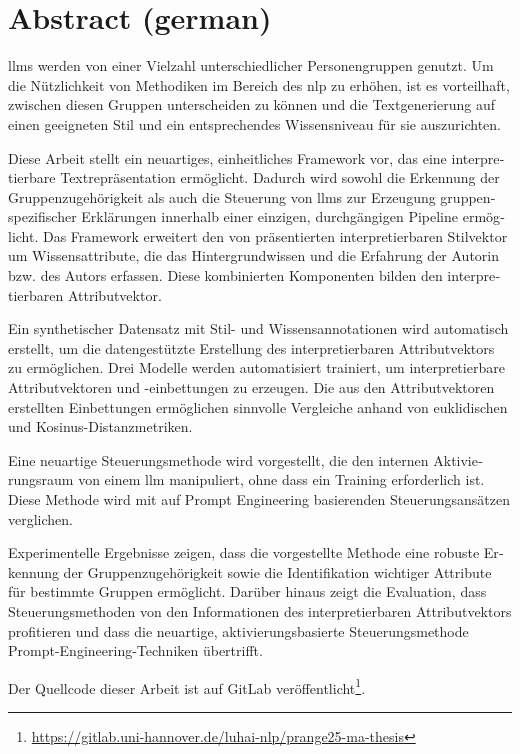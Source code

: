 \vspace*{20mm}

\chapter*{Abstract (german)}%
\label{sec:abstract-german}
\vspace*{-10mm}

\begin{otherlanguage}{ngerman}
  \Acfp{llm} werden von einer Vielzahl unterschiedlicher Personengruppen genutzt. Um die Nützlichkeit von Methodiken im Bereich des \acf{nlp} zu erhöhen, ist es vorteilhaft, zwischen diesen Gruppen unterscheiden zu können und die Textgenerierung auf einen geeigneten Stil und ein entsprechendes Wissensniveau für sie auszurichten.

  Diese Arbeit stellt ein neuartiges, einheitliches Framework vor, das eine interpretierbare Textrepräsentation ermöglicht. Dadurch wird sowohl die Erkennung der Gruppenzugehörigkeit als auch die Steuerung von \acp{llm} zur Erzeugung gruppenspezifischer Erklärungen innerhalb einer einzigen, durchgängigen Pipeline ermöglicht. Das Framework erweitert den von \citet{patelLearningInterpretableStyle2023} präsentierten interpretierbaren Stilvektor um Wissensattribute, die das Hintergrundwissen und die Erfahrung der Autorin bzw. des Autors erfassen. Diese kombinierten Komponenten bilden den interpretierbaren Attributvektor.

  Ein synthetischer Datensatz mit Stil- und Wissensannotationen wird automatisch erstellt, um die datengestützte Erstellung des interpretierbaren Attributvektors zu ermöglichen. Drei Modelle werden automatisiert trainiert, um interpretierbare Attributvektoren und -einbettungen zu erzeugen. Die aus den Attributvektoren erstellten Einbettungen ermöglichen sinnvolle Vergleiche anhand von euklidischen und Kosinus-Distanzmetriken.

  Eine neuartige Steuerungsmethode wird vorgestellt, die den internen Aktivierungsraum von einem \ac{llm} manipuliert, ohne dass ein Training erforderlich ist. Diese Methode wird mit auf Prompt Engineering basierenden Steuerungsansätzen verglichen.

  Experimentelle Ergebnisse zeigen, dass die vorgestellte Methode eine robuste Erkennung der Gruppenzugehörigkeit sowie die Identifikation wichtiger Attribute für bestimmte Gruppen ermöglicht. Darüber hinaus zeigt die Evaluation, dass Steuerungsmethoden von den Informationen des interpretierbaren Attributvektors profitieren und dass die neuartige, aktivierungsbasierte Steuerungsmethode Prompt-Engineering-Techniken übertrifft.

  Der Quellcode dieser Arbeit ist auf GitLab veröffentlicht\footnote{\url{https://gitlab.uni-hannover.de/luhai-nlp/prange25-ma-thesis}}.
\end{otherlanguage}
